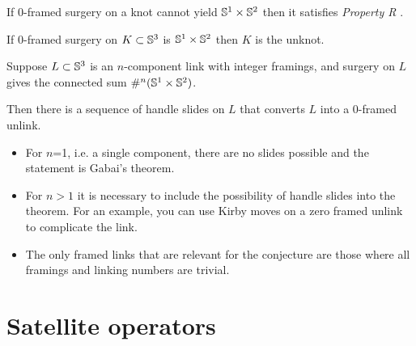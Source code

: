 \begin{definition}[Property R]
	If $0$-framed surgery on a knot cannot yield
	$\mathbb{S}^{1} \times \mathbb{S}^{2}$ then it
	satisfies
	\textit{Property R} .
\end{definition}

\begin{theorem}[Gabai]
	If $0$-framed surgery on $K \subset \mathbb{S}^{3}$ is 
	$\mathbb{S}^{1} \times \mathbb{S}^{2}$
	then $K$ is the unknot.
\end{theorem}


\begin{conjecture}
	Suppose $L \subset \mathbb{S}^{3}$ is an $n$-component
	link with integer framings, and surgery on $L$ gives
	the connected sum $ \#^{n} (\mathbb{S}^{1} \times \mathbb{S}^{2}) $.
	
	Then there is a sequence of handle slides on $L$
	that converts $L$ into a $0$-framed unlink.
\end{conjecture}

\begin{remark}
	\begin{itemize}
		\item For $n$=1, i.e. a single component, there are no slides
		possible and the statement is Gabai's theorem.
		
		\item For $n > 1$ it is necessary to include the possibility
		of handle slides into the theorem.
		For an example, you can use Kirby moves
		on a zero framed unlink to complicate the link.
		
		\item The only framed links that are relevant for the
		conjecture are those where all framings and linking
		numbers are trivial.
	\end{itemize}
\end{remark}





\newpage
\section{Satellite operators}

